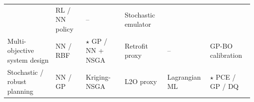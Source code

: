 \begin{table}[!t]
\begin{tabularx}{\textwidth}{@{}L{0.16\textwidth} L{0.18\textwidth} L{0.16\textwidth} L{0.16\textwidth} L{0.14\textwidth} L{0.14\textwidth}@{}}
      & RL / NN policy \cite{Chaturvedi2024149,Hussien20226442}
      & --
      & Stochastic emulator \cite{Liang20222192,Khalid20241959} \\
    Multi-objective system design
      & NN / RBF \cite{Hirvonen2017323,Wang2017,Schulte2020}
      & $\star$ GP / NN + NSGA \cite{Roth2019214,Han2018622,Aghaei Pour2022303,Reis2025}
      & Retrofit proxy \cite{Thrampoulidis2021}
      & --
      & GP-BO calibration \cite{Chakrabarty2021} \\
    Stochastic / robust planning
      & NN / GP \cite{Lawson201647,Liu20222679,Hu2020}
      & Kriging-NSGA \cite{Lin2023,Pang2023}
      & L2O proxy \cite{Liang20246508}
      & Lagrangian ML \cite{Wu2024391}
      & $\star$ PCE / GP / DQ \cite{Muhlpfordt20194806,Safta20172535,Lu201991827,Chen2023657} \\
    \bottomrule
  \end{tabularx}
\end{table}
